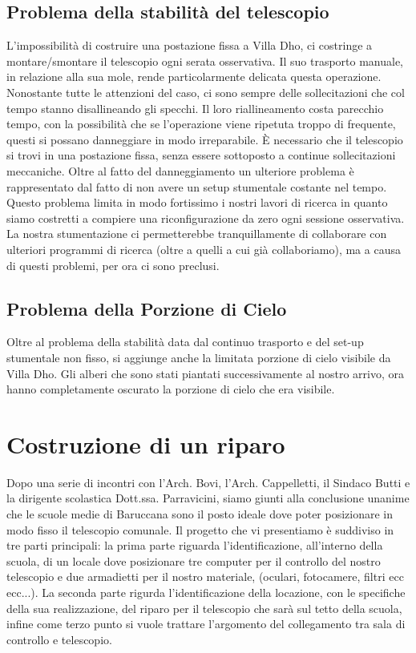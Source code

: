 \documentclass[a4paper,12pt]{article}
\begin{document}
\subsection{Problema della stabilit\`a del telescopio}
L'impossibilit\`a di costruire una postazione fissa a Villa Dho, ci costringe a montare/smontare il telescopio ogni serata osservativa. Il suo trasporto manuale, in relazione alla sua mole, rende particolarmente delicata questa operazione. Nonostante tutte le attenzioni del caso, ci sono sempre delle sollecitazioni che col tempo stanno disallineando gli specchi. Il loro riallineamento costa parecchio tempo, con la possibilit\`a che se l'operazione viene ripetuta troppo di frequente, questi si possano danneggiare in modo irreparabile. \`E necessario che il telescopio si trovi in una postazione fissa, senza essere sottoposto a continue sollecitazioni meccaniche.
Oltre al fatto del danneggiamento un ulteriore problema \`e rappresentato dal fatto di non avere un setup stumentale costante nel tempo. Questo problema limita in modo fortissimo i nostri lavori di ricerca in quanto siamo costretti a compiere una riconfigurazione da zero ogni sessione osservativa. La nostra stumentazione ci permetterebbe tranquillamente di collaborare con ulteriori programmi di ricerca (oltre a quelli a cui gi\`a collaboriamo), ma a causa di questi problemi, per ora ci sono preclusi.
\subsection{Problema della Porzione di Cielo}
Oltre al problema della stabilit\`a data dal continuo trasporto e del set-up stumentale non fisso, si aggiunge anche la limitata porzione di cielo visibile da Villa Dho. Gli alberi che sono stati piantati successivamente al nostro arrivo, ora hanno completamente oscurato la porzione di cielo che era visibile.

\section{Costruzione di un riparo}
Dopo una serie di incontri con l'Arch. Bovi, l'Arch. Cappelletti, il Sindaco Butti e la dirigente scolastica Dott.ssa. Parravicini, siamo giunti alla conclusione unanime che le scuole medie di Baruccana sono il posto ideale dove poter posizionare in modo fisso il telescopio comunale. Il progetto che vi presentiamo \`e suddiviso in tre parti principali: la prima parte riguarda l'identificazione, all'interno della scuola, di un locale dove posizionare tre computer per il controllo del nostro telescopio e due armadietti per il nostro materiale, (oculari, fotocamere, filtri ecc ecc...). La seconda parte rigurda l'identificazione della locazione, con le specifiche
della sua realizzazione, del riparo per il telescopio che sar\`a sul tetto della scuola, infine come terzo punto si vuole trattare l'argomento del collegamento tra sala di controllo e telescopio.
\end{document}
